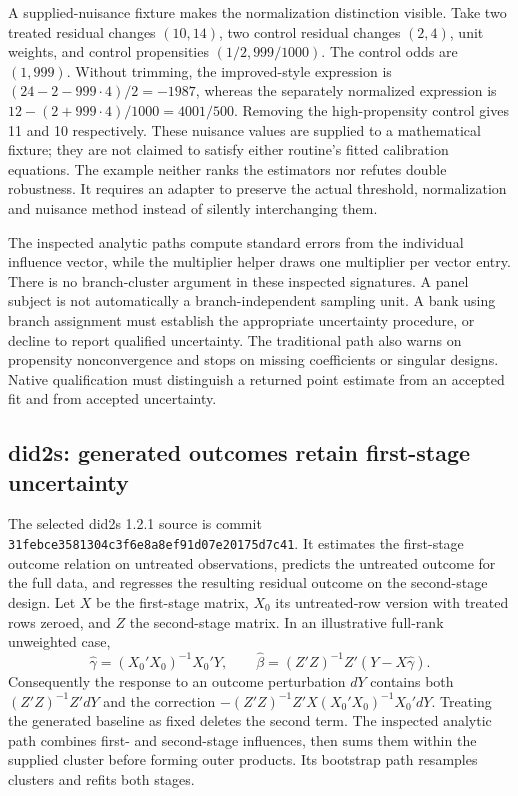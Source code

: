 A supplied-nuisance fixture makes the normalization distinction visible.
Take two treated residual changes $(10,14)$, two control residual changes
$(2,4)$, unit weights, and control propensities $(1/2,999/1000)$. The control
odds are $(1,999)$. Without trimming, the improved-style expression is
$(24-2-999\cdot4)/2=-1987$, whereas the separately normalized expression is
$12-(2+999\cdot4)/1000=4001/500$. Removing the high-propensity control gives
11 and 10 respectively. These nuisance values are supplied to a mathematical
fixture; they are not claimed to satisfy either routine's fitted calibration
equations. The example neither ranks the estimators nor refutes double
robustness. It requires an adapter to preserve the actual threshold,
normalization and nuisance method instead of silently interchanging them.
\citep{exec24_drdid_reuse_source,exec24_panel_reuse_reference}

The inspected analytic paths compute standard errors from the individual
influence vector, while the multiplier helper draws one multiplier per vector
entry. There is no branch-cluster argument in these inspected signatures.
A panel subject is not automatically a branch-independent sampling unit.
A bank using branch assignment must establish the appropriate uncertainty
procedure, or decline to report qualified uncertainty. The traditional path
also warns on propensity nonconvergence and stops on missing coefficients or
singular designs. Native qualification must distinguish a returned point
estimate from an accepted fit and from accepted uncertainty.
\citep{exec24_drdid_reuse_source}

\subsection{did2s: generated outcomes retain first-stage uncertainty}
The selected did2s 1.2.1 source is commit
\texttt{31febce3581304c3f6e8a8ef91d07e20175d7c41}.
It estimates the first-stage outcome relation on untreated observations,
predicts the untreated outcome for the full data, and regresses the resulting
residual outcome on the second-stage design. Let $X$ be the first-stage
matrix, $X_0$ its untreated-row version with treated rows zeroed, and $Z$ the
second-stage matrix. In an illustrative full-rank unweighted case,
\[
 \widehat\gamma=(X_0'X_0)^{-1}X_0'Y,
 \qquad
 \widehat\beta=(Z'Z)^{-1}Z'(Y-X\widehat\gamma).
\]
Consequently the response to an outcome perturbation $dY$ contains both
$(Z'Z)^{-1}Z'dY$ and the correction
$-(Z'Z)^{-1}Z'X(X_0'X_0)^{-1}X_0'dY$.
Treating the generated baseline as fixed deletes the second term.
The inspected analytic path combines first- and second-stage influences,
then sums them within the supplied cluster before forming outer products.
Its bootstrap path resamples clusters and refits both stages.
\citep{exec24_did2s_reuse_source}

